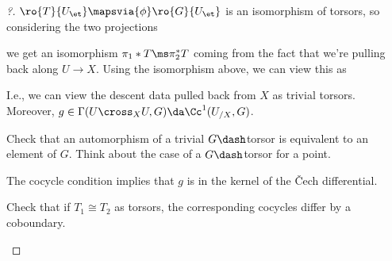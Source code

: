 \begin{proof}[?]

\(\ro{T}{U_\et} \mapsvia{\phi} \ro{G}{U_\et}\) is an isomorphism of
torsors, so considering the two projections

\begin{center}
\end{center}

we get an isomorphism \(\pi_1*T \ms \pi_2^* T\) coming from the fact
that we're pulling back along \(U\to X\). Using the isomorphism above,
we can view this as

\begin{center}
\end{center}

I.e., we can view the descent data pulled back from \(X\) as trivial
torsors. Moreover, \(g\in \Gamma(U\cross_X U, G) \da \Cc^1(U_{/X}, G)\).

\begin{exercise}[?]

Check that an automorphism of a trivial \(G\dash\)torsor is equivalent
to an element of \(G\). Think about the case of a \(G\dash\)torsor for a
point.

\end{exercise}

\begin{claim}

The cocycle condition implies that \(g\) is in the kernel of the Čech
differential.

\end{claim}

\begin{exercise}[?]

Check that if \(T_1 \cong T_2\) as torsors, the corresponding cocycles
differ by a coboundary.

\end{exercise}

\end{proof}

